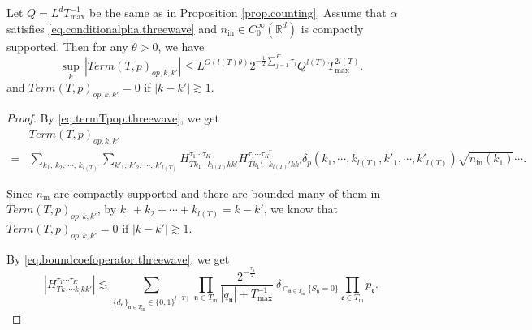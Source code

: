 \begin{lem}\label{lem.Tpvarianceop} Let $Q=L^dT^{-1}_{\text{max}}$ be the same as in Proposition \ref{prop.counting}. Assume that $\alpha$ satisfies \eqref{eq.conditionalpha.threewave} and $n_{\mathrm{in}} \in C^\infty_0(\mathbb{R}^d)$ is compactly supported. Then for any $\theta>0$, we have
\begin{equation}
    \sup_k\, |Term(T, p)_{op,k,k
    '}|\le L^{O(l(T)\theta)}2^{-\frac{1}{2}\sum_{j=1}^K \tau_{j}} Q^{l(T)} T_{\text{max}}^{2l(T)}.
\end{equation}
and $Term(T, p)_{op,k,k
    '}=0$ if $|k-k'|\gtrsim 1$.
\end{lem}
\begin{proof} By \eqref{eq.termTpop.threewave}, we get
\begin{equation}
\begin{split}
    &Term(T, p)_{op,k,k
    '}
    \\
    =&\sum_{k_1,\, k_2,\, \cdots,\, k_{l(T)}}\sum_{k'_1,\, k'_2,\, \cdots,\, k'_{l(T)}} H^{\tau_1\cdots \tau_{K}}_{Tk_1\cdots k_{l(T)}kk'} \overline{H^{\tau_1\cdots \tau_{K}}_{Tk_1'\cdots k_{l(T)}'kk'}} \delta_{p}(k_1,\cdots, k_{l(T)}, k'_1,\cdots, k'_{l(T)})\sqrt{n_{\textrm{in}}(k_1)}\cdots.
\end{split}
\end{equation}

Since $n_{\mathrm{in}}$ are compactly supported and there are bounded many of them in $Term(T, p)_{op,k,k'}$, by $k_1 + k_2 + \cdots + k_{l(T)}=k-k'$, we know that $Term(T, p)_{op,k,k'}=0$ if $|k-k'|\gtrsim 1$.

By \eqref{eq.boundcoefoperator.threewave}, we get  %
\begin{equation}\label{eq.termlemmaeq1op.threewave}
    |H^{\tau_1\cdots \tau_{K}}_{Tk_1\cdots k_{l}kk'}|\lesssim \sum_{\{d_{\mathfrak{n}}\}_{\mathfrak{n}\in T_{\text{in}}}\in\{0,1\}^{l(T)}}\prod_{\mathfrak{n}\in T_{\text{in}}}\frac{2^{-\frac{\tau_{\mathfrak{n}}}{2}}}{|q_{\mathfrak{n}}|+T^{-1}_{\text{max}}}\ \delta_{\cap_{\mathfrak{n}\in T_{\text{in}}} \{S_{\mathfrak{n}}=0\}}\prod_{\mathfrak{e}\in T_{\text{in}}} p_{\mathfrak{e}}.
\end{equation}


\end{proof}
